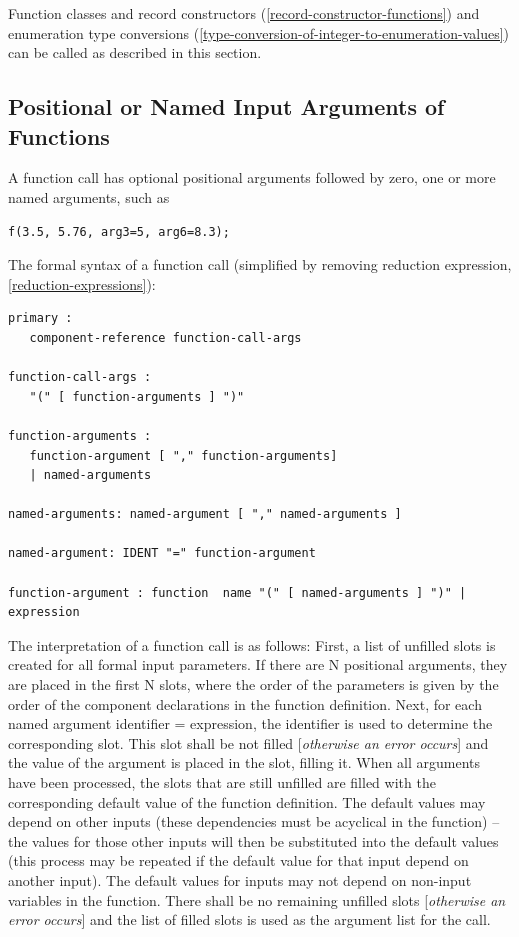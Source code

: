 \documentclass[10pt,a4paper]{report}
\def\doublelabel#1{\label{#1}}
\begin{document}
Function classes and record constructors (\ref{record-constructor-functions}) and enumeration type
conversions (\ref{type-conversion-of-integer-to-enumeration-values}) can be called as described in this section.

\subsection{Positional or Named Input Arguments of Functions}\doublelabel{positional-or-named-input-arguments-of-functions}

A function call has optional positional arguments followed by zero, one
or more named arguments, such as

\begin{lstlisting}[language=modelica]
f(3.5, 5.76, arg3=5, arg6=8.3);
\end{lstlisting}

The formal syntax of a function call (simplified by removing reduction
expression, \ref{reduction-expressions}):
\begin{lstlisting}[language=grammar]
primary :
   component-reference function-call-args

function-call-args :
   "(" [ function-arguments ] ")"

function-arguments :
   function-argument [ "," function-arguments]
   | named-arguments

named-arguments: named-argument [ "," named-arguments ]

named-argument: IDENT "=" function-argument

function-argument : function  name "(" [ named-arguments ] ")" | expression
\end{lstlisting}


The interpretation of a function call is as follows: First, a list of
unfilled slots is created for all formal input parameters. If there are
N positional arguments, they are placed in the first N slots, where the
order of the parameters is given by the order of the component
declarations in the function definition. Next, for each named argument
identifier = expression, the identifier is used to determine the
corresponding slot. This slot shall be not filled {[}\emph{otherwise an
error occurs}{]} and the value of the argument is placed in the slot,
filling it. When all arguments have been processed, the slots that are
still unfilled are filled with the corresponding default value of the
function definition. The default values may depend on other inputs
(these dependencies must be acyclical in the function) -- the values for
those other inputs will then be substituted into the default values
(this process may be repeated if the default value for that input depend
on another input). The default values for inputs may not depend on
non-input variables in the function. There shall be no remaining
unfilled slots {[}\emph{otherwise an error occurs}{]} and the list of
filled slots is used as the argument list for the call.
\end{document}
